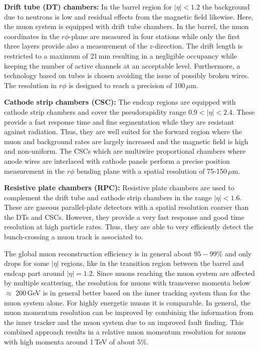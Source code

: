 \begin{description}
 \item \textbf{Drift tube (DT) chambers:} In the barrel region for $|\eta| < 1.2$ the background due to neutrons is low and residual effects from the magnetic field likewise. Here, the muon system is equipped with drift tube chambers. In the barrel, the muon coordinates in the $r\phi$-plane are measured in four stations while only the first three layers provide also a measurement of the $z$-direction. The drift length is restricted to a maximum of 21\,mm resulting in a negligible occupancy while keeping the number of active channels at an acceptable level. Furthermore, a technology based on tubes is chosen avoiding the issue of possibly broken wires. The resolution in $r\phi$ is designed to reach a precision of 100\,$\mu$m.
 \item \textbf{Cathode strip chambers (CSC):} The endcap regions are equipped with cathode strip chambers and cover the pseudorapidity range $0.9 < |\eta| < 2.4$. These provide a fast response time and fine segmentation while they are resistant against radiation. Thus, they are well suited for the forward region where the muon and background rates are largely increased and the magnetic field is high and non-uniform. The CSCs which are multiwire proportional chambers where anode wires are interlaced with cathode panels perform a precise position measurement in the $r\phi$ bending plane with a spatial resolution of 75-150\,$\mu$m. 
 \item \textbf{Resistive plate chambers (RPC):} Resistive plate chambers are used to complement the drift tube and cathode strip chambers in the range $|\eta| < 1.6$. These are gaseous parallel-plate detectors with a spatial resolution coarser than the DTs and CSCs. However, they provide a very fast response and good time resolution at high particle rates. Thus, they are able to very efficiently detect the bunch-crossing a muon track is associated to. 
\end{description}
The global muon reconstruction efficiency is in general about $95-99\%$ and only drops for some $|\eta|$ regions, like \eg in the transition region between the barrel and endcap part around $|\eta|=1.2$. Since muons reaching the muon system are affected by multiple scattering, the resolution for muons with transverse momenta below $\approx$ 200\,GeV is in general better based on the inner tracking system than for the muon system alone. For highly energetic muons it is comparable. In general, the muon momentum resolution can be improved by combining the information from the inner tracker and the muon system due to an improved fault finding. This combined approach results in a relative muon momentum resolution for muons with high momenta around 1\,TeV of about 5\%.

